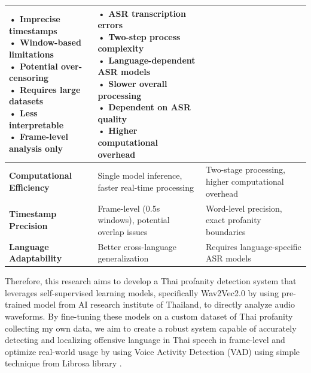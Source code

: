 \documentclass[11pt]{article}
\begin{document}
\begin{table}[H]
\begin{tabular}{|p{2.8cm}|p{5.5cm}|p{5.5cm}|}
        \makecell[l]{
            • Imprecise timestamps \\
            • Window-based limitations \\
            • Potential over-censoring \\
            • Requires large datasets \\
            • Less interpretable \\
            • Frame-level analysis only
        } & 
        \makecell[l]{
            • ASR transcription errors \\
            • Two-step process complexity \\
            • Language-dependent ASR models \\
            • Slower overall processing \\
            • Dependent on ASR quality \\
            • Higher computational overhead
        } \\
        \hline
        \makecell[l]{\textbf{Computational} \\ \textbf{Efficiency}} & 
        Single model inference, faster real-time processing & 
        Two-stage processing, higher computational overhead \\
        \hline
        \makecell[l]{\textbf{Timestamp} \\ \textbf{Precision}} & 
        Frame-level (0.5s windows), potential overlap issues & 
        Word-level precision, exact profanity boundaries \\
        \hline
        \makecell[l]{\textbf{Language} \\ \textbf{Adaptability}} & 
        Better cross-language generalization & 
        Requires language-specific ASR models \\
        \hline
    \end{tabular}
\end{table}

Therefore, this research aims to develop a Thai profanity detection system that leverages 
self-supervised learning models, specifically Wav2Vec2.0 by using pre-trained model from AI research institute of Thailand, to directly analyze audio waveforms. 
By fine-tuning these models on a custom dataset of Thai profanity collecting my own data, we aim to create a robust system capable of accurately detecting and 
localizing offensive language in Thai speech in frame-level and optimize real-world usage by using Voice Activity Detection (VAD) using simple technique from 
Librosa library \cite{mcfee2015librosa}.
\end{document}
